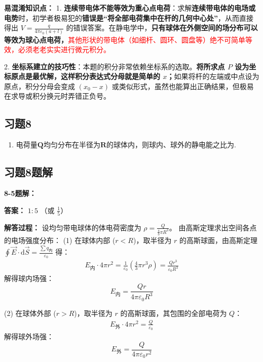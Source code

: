 \textbf{易混淆知识点： }
1. \textbf{连续带电体不能等效为重心点电荷}：求解\textbf{连续带电体的电场或电势}时，初学者极易犯的\textbf{错误是“将全部电荷集中在杆的几何中心处”}，从而直接得出 $V = \frac{q}{4\pi\varepsilon_0(a+l)}$ 的错误答案。在静电学中，\textbf{只有球体在外侧空间的场分布可以等效为球心点电荷，}\textcolor{red}{其他形状的带电体（如细杆、圆环、圆盘等）绝不可简单等效，必须老老实实进行微元积分。}

2. \textbf{坐标系建立的技巧性}：本题的积分非常依赖坐标系的选取。\textbf{将所求点 $P$ 设为坐标原点是最优解，这样积分表达式分母就是简单的 $x$；}如果将杆的左端或中点设为原点，积分分母会变成 $(x_0-x)$ 或类似形式，虽然也能算出正确结果，但极易在求导或积分换元时弄错正负号。

\newpage

\subsection{习题8}

\begin{enumerate}
	\item [\textbf{8-5}]
	电荷量$\mathbf{Q}$均匀分布在半径为$\mathbf{R}$的球体内，则球内、球外的静电能之比为\underline{\hspace{6em}}.
\end{enumerate}

\subsection*{习题8题解}
\textbf{8-5题解： }
\setcounter{equation}{0}
\renewcommand{\theHequation}{8-5.\arabic{equation}}

\textbf{答案： }
$1:5$ （或 $\frac{1}{5}$）

\textbf{解答过程： }
设均匀带电球体的体电荷密度为 $\rho = \frac{Q}{\frac{4}{3}\pi R^3}$。
由高斯定理求出空间各点的电场强度分布：
(1) 在球体内部 ($r < R$)，取半径为 $r$ 的高斯球面，由高斯定理 $\oint \vec{E} \cdot \mathrm{d}\vec{S} = \frac{\sum q_{\text{内}}}{\varepsilon_0}$ 得：
\begin{align*}
	E_{\text{内}} \cdot 4\pi r^2 = \frac{1}{\varepsilon_0} \left( \frac{4}{3}\pi r^3 \rho \right) = \frac{Q r^3}{\varepsilon_0 R^3}
\end{align*}
解得球内场强：
\begin{equation}\label{eq:8-5-1}
	E_{\text{内}} = \frac{Qr}{4\pi\varepsilon_0 R^3}
\end{equation}

(2) 在球体外部 ($r > R$)，取半径为 $r$ 的高斯球面，其包围的全部电荷为 $Q$：
\begin{align*}
	E_{\text{外}} \cdot 4\pi r^2 = \frac{Q}{\varepsilon_0}
\end{align*}
解得球外场强：
\begin{equation}\label{eq:8-5-2}
	E_{\text{外}} = \frac{Q}{4\pi\varepsilon_0 r^2}
\end{equation}

